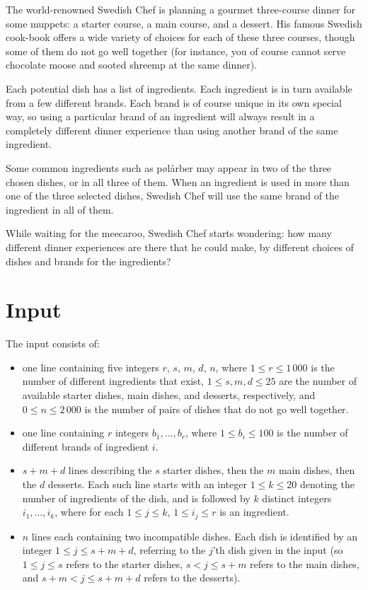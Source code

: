 
%
\noindent
The world-renowned Swedish Chef is planning a gourmet three-course dinner
for some muppets: a starter course, a main course, and a dessert.
His famous Swedish cook-book offers a wide variety of choices for each
of these three courses, though some of them do not go well together
(for instance, you of course cannot serve chocolate moose and sooted
shreemp at the same dinner).

Each potential dish has a list of ingredients.  Each ingredient is in
turn available from a few different brands.  Each brand is of course
unique in its own special way, so using a particular brand of an
ingredient will always result in a completely different dinner
experience than using another brand of the same ingredient.

Some common ingredients such as pølårber may appear in two of the three
chosen dishes, or in all three of them.  When an ingredient is used in
more than one of the three selected dishes, Swedish Chef will use the
same brand of the ingredient in all of them.

While waiting for the meecaroo, Swedish Chef starts wondering: how
many different dinner experiences are there that he could make, by
different choices of dishes and brands for the ingredients?

\section*{Input}

The input consists of:
\begin{itemize}
\item one line containing five integers $r$, $s$, $m$,
  $d$, $n$, where $1 \le r \le 1\,000$ is the number of different
  ingredients that exist, $1 \le s, m, d \le 25$ are the number of available
  starter dishes, main dishes, and desserts, respectively, and $0 \le n \le
  2\,000$ is the number of pairs of dishes that do not go well
  together.
\item one line containing $r$ integers $b_1, \ldots, b_r$, where $1
  \le b_i \le 100$ is the number of different brands of ingredient $i$.
\item $s+m+d$ lines describing the $s$ starter dishes, then the $m$
  main dishes, then the $d$ desserts.  Each such line starts with an
  integer $1 \le k \le 20$ denoting the number of ingredients of the
  dish, and is followed by $k$ distinct integers $i_1, \ldots, i_k$,
  where for each $1 \le j \le k$, $1 \le i_j \le r$ is an ingredient.
\item $n$ lines each containing two incompatible dishes.  Each dish is
  identified by an integer $1 \le j \le s+m+d$, referring to the
  $j$'th dish given in the input (so $1 \le j \le s$ refers to the
  starter dishes, $s < j \le s+m$ refers to the main dishes, and $s+m
  < j \le s+m+d$ refers to the desserts).
\end{itemize}

